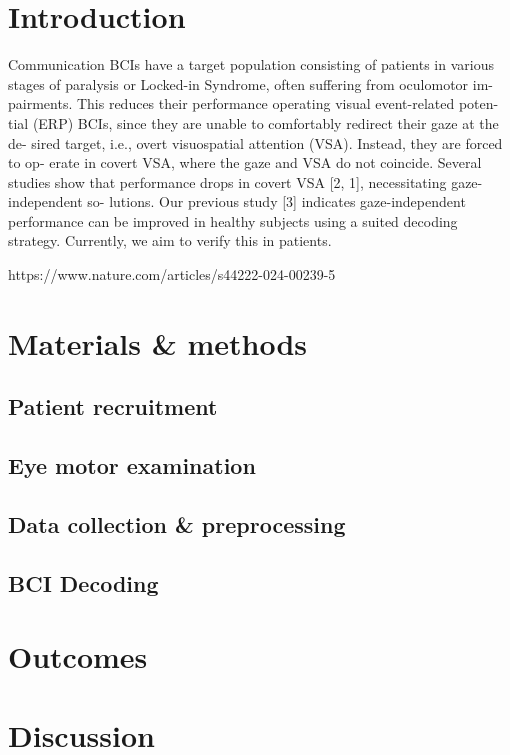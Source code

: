\section{Introduction}

Communication BCIs have a target population consisting of patients in various
stages of paralysis or Locked-in Syndrome, often suffering from oculomotor im-
pairments. This reduces their performance operating visual event-related poten-
tial (ERP) BCIs, since they are unable to comfortably redirect their gaze at the de-
sired target, i.e., overt visuospatial attention (VSA). Instead, they are forced to op-
erate in covert VSA, where the gaze and VSA do not coincide. Several studies show
that performance drops in covert VSA [2, 1], necessitating gaze-independent so-
lutions. Our previous study [3] indicates gaze-independent performance can be
improved in healthy subjects using a suited decoding strategy. Currently, we aim
to verify this in patients.

https://www.nature.com/articles/s44222-024-00239-5

\section{Materials \& methods}
\subsection{Patient recruitment}
\subsection{Eye motor examination}
\subsection{Data collection \& preprocessing}
\subsection{BCI Decoding}
\section{Outcomes}
\section{Discussion}
